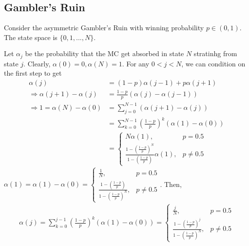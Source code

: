 \documentclass[11pt]{elegantbook}
\begin{document}
\subsection{Gambler's Ruin}
\begin{example}
    Consider the asymmetric Gambler's Ruin with winning probability $p\in (0,1)$. The state space is $\{0,1,...,N\}$.
\end{example}
Let $\alpha_j$ be the probability that the MC get absorbed in state $N$ stratinhg from state $j$. Clearly, $\alpha(0)=0,\alpha(N)=1$. For any $0<j<N$, we can condition on the first step to get
\begin{equation}
    \begin{aligned}
        \alpha(j)&=(1-p)\alpha(j-1)+p\alpha(j+1)\\
        \Rightarrow \alpha(j+1)-\alpha(j)&=\frac{1-p}{p}(\alpha(j)-\alpha(j-1))\\
        \Rightarrow 1=\alpha(N)-\alpha(0)&=\sum_{j=0}^{N-1}(\alpha(j+1)-\alpha(j))\\
        &=\sum_{k=0}^{N-1}\left(\frac{1-p}{p}\right)^k(\alpha(1)-\alpha(0))\\
        &=\left\{\begin{matrix}
            N\alpha(1),&p=0.5\\
            \frac{1-\left(\frac{1-p}{p}\right)^{N}}{1-\left(\frac{1-p}{p}\right)}\alpha(1),&p\neq 0.5
        \end{matrix}\right.
    \end{aligned}
    \nonumber
\end{equation}
$\alpha(1)=\alpha(1)-\alpha(0)=\left\{\begin{matrix}
    \frac{1}{N},&p=0.5\\
    \frac{1-\left(\frac{1-p}{p}\right)}{1-\left(\frac{1-p}{p}\right)^N},&p\neq 0.5
\end{matrix}\right.$. Then,
\begin{equation}
    \begin{aligned}
        \alpha(j)=\sum_{k=0}^{j-1}\left(\frac{1-p}{p}\right)^k(\alpha(1)-\alpha(0))=\left\{\begin{matrix}
            \frac{j}{N},&p=0.5\\
            \frac{1-\left(\frac{1-p}{p}\right)^{j}}{1-\left(\frac{1-p}{p}\right)^N},&p\neq 0.5
        \end{matrix}\right.
    \end{aligned}
    \nonumber
\end{equation}
\end{document}
